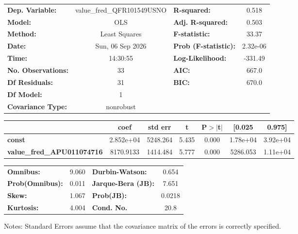 \begin{center}
\begin{tabular}{lclc}
\toprule
\textbf{Dep. Variable:}            & value\_fred\_QFR101549USNO & \textbf{  R-squared:         } &     0.518   \\
\textbf{Model:}                    &            OLS             & \textbf{  Adj. R-squared:    } &     0.503   \\
\textbf{Method:}                   &       Least Squares        & \textbf{  F-statistic:       } &     33.37   \\
\textbf{Date:}                     &      Sun, 06 Sep 2026      & \textbf{  Prob (F-statistic):} &  2.32e-06   \\
\textbf{Time:}                     &          14:30:55          & \textbf{  Log-Likelihood:    } &   -331.49   \\
\textbf{No. Observations:}         &               33           & \textbf{  AIC:               } &     667.0   \\
\textbf{Df Residuals:}             &               31           & \textbf{  BIC:               } &     670.0   \\
\textbf{Df Model:}                 &                1           & \textbf{                     } &             \\
\textbf{Covariance Type:}          &         nonrobust          & \textbf{                     } &             \\
\bottomrule
\end{tabular}
\begin{tabular}{lcccccc}
                                   & \textbf{coef} & \textbf{std err} & \textbf{t} & \textbf{P$> |$t$|$} & \textbf{[0.025} & \textbf{0.975]}  \\
\midrule
\textbf{const}                     &    2.852e+04  &     5248.264     &     5.435  &         0.000        &     1.78e+04    &     3.92e+04     \\
\textbf{value\_fred\_APU011074716} &    8170.9133  &     1414.484     &     5.777  &         0.000        &     5286.053    &     1.11e+04     \\
\bottomrule
\end{tabular}
\begin{tabular}{lclc}
\textbf{Omnibus:}       &  9.060 & \textbf{  Durbin-Watson:     } &    0.654  \\
\textbf{Prob(Omnibus):} &  0.011 & \textbf{  Jarque-Bera (JB):  } &    7.651  \\
\textbf{Skew:}          &  1.067 & \textbf{  Prob(JB):          } &   0.0218  \\
\textbf{Kurtosis:}      &  4.004 & \textbf{  Cond. No.          } &     20.8  \\
\bottomrule
\end{tabular}
\end{center}

Notes: \newline
 [1] Standard Errors assume that the covariance matrix of the errors is correctly specified.
